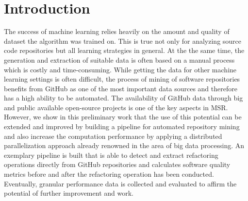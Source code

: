
\section{Introduction}
\label{sec:intro}
The success of machine learning relies heavily on the amount and quality of dataset the algorithm was trained on. This is true not only for analyzing source code repositories but all learning strategies in general. At the the same time, the generation and extraction of suitable data is often based on a manual process which is costly and time-consuming. While getting the data for other machine learning settings is often difficult, the process of mining of software repositories benefits from GitHub as one of the most important data sources and therefore has a high ability to be automated. The availability of GitHub data through big and public available open-source projects is one of the key aspects in MSR.\\
However, we show in this preliminary work that the use of this potential can be extended and improved by building a pipeline for automated repository mining and also increase the computation performance by applying a distributed parallelization approach already renowned in the area of big data processing. An exemplary pipeline is built that is able to detect and extract refactoring operations directly from GitHub repositories and calculates software quality metrics before and after the refactoring operation has been conducted. Eventually,  granular performance data is collected and evaluated to affirm the potential of further improvement and work.